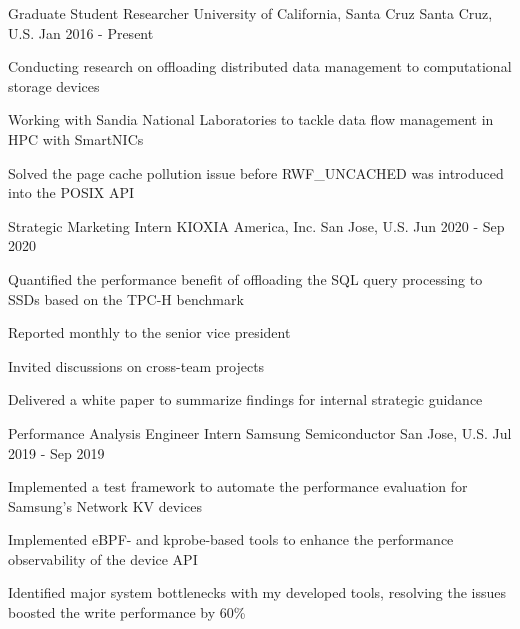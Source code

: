 

\begin{cventries}

  \cventry
    {Graduate Student Researcher} %
    {University of California, Santa Cruz} %
    {Santa Cruz, U.S.} %
    {Jan 2016 - Present} %
    {
      \begin{cvitems} %
        \item {Conducting research on offloading distributed data management to computational storage devices}
        \item {Working with Sandia National Laboratories to tackle data flow management in HPC with SmartNICs}
        \item {Solved the page cache pollution issue before RWF\_UNCACHED was introduced into the POSIX API}
      \end{cvitems}
    }

  \cventry
    {Strategic Marketing Intern} %
    {KIOXIA America, Inc.} %
    {San Jose, U.S.} %
    {Jun 2020 - Sep 2020} %
    {
      \begin{cvitems} %
        \item {Quantified the performance benefit of offloading the SQL query processing to SSDs based on the TPC-H benchmark}
        \item {Reported monthly to the senior vice president}
        \item {Invited discussions on cross-team projects}
        \item {Delivered a white paper to summarize findings for internal strategic guidance}
      \end{cvitems}
    }

  \cventry
    {Performance Analysis Engineer Intern} %
    {Samsung Semiconductor} %
    {San Jose, U.S.} %
    {Jul 2019 - Sep 2019} %
    {
      \begin{cvitems} %
        \item {Implemented a test framework to automate the performance evaluation for Samsung's Network KV devices}
        \item {Implemented eBPF- and kprobe-based tools to enhance the performance observability of the device API}
        \item {Identified major system bottlenecks with my developed tools, resolving the issues boosted the write performance by 60\%}
      \end{cvitems}
    }


\end{cventries}
